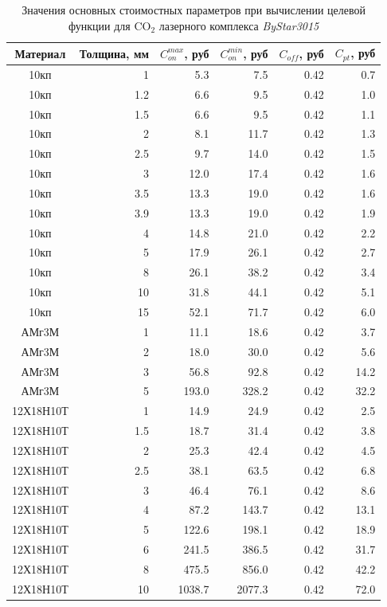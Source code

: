 \documentclass[11pt,twoside,openany]{report}
\begin{document}
\begin{table}
  \caption{
    Значения основных стоимостных параметров
    при вычислении целевой функции для
    CO$_2$ лазерного комплекса
    {\it ByStar3015}
  }
  \label{c-table}
  \centering
  \begin{tabular}{c*{5}{|r}}
    \hline
    Материал & Толщина, мм & $C_{on}^{max}$, руб & $C_{on}^{min}$, руб & $C_{off}$, руб & $C_{pt}$, руб \\
    \hline
    10кп	& 1	& 5.3	& 7.5	& 0.42	& 0.7 \\
    10кп	& 1.2	& 6.6	& 9.5	& 0.42	& 1.0 \\
    10кп	& 1.5	&  6.6	& 9.5	& 0.42	& 1.1 \\
    10кп	& 2	& 8.1	& 11.7	& 0.42	& 1.3 \\
    10кп	& 2.5	&	9.7	& 14.0	& 0.42	& 1.5 \\
    10кп	& 3	& 12.0	& 17.4	& 0.42	& 1.6 \\
    10кп	& 3.5	&	13.3	& 19.0	& 0.42	& 1.6 \\
    10кп	& 3.9	&	13.3	& 19.0	& 0.42	& 1.9 \\
    10кп	& 4	&	14.8	& 21.0	& 0.42	& 2.2 \\
    10кп	& 5	&	17.9	& 26.1	& 0.42	& 2.7 \\
    10кп	& 8	&	26.1	& 38.2	& 0.42	& 3.4 \\
    10кп	& 10	&	31.8	& 44.1	& 0.42	& 5.1 \\
    10кп	& 15	&	52.1	& 71.7	& 0.42	& 6.0 \\
    АМг3М	& 1	& 11.1	& 18.6	& 0.42	& 3.7 \\
    АМг3М	& 2	& 18.0	& 30.0	& 0.42	& 5.6 \\
    АМг3М	& 3	& 56.8	& 92.8	& 0.42	& 14.2 \\
    АМг3М	& 5	& 193.0	& 328.2	& 0.42	& 32.2 \\
    12Х18Н10Т	& 1	& 14.9	& 24.9	& 0.42	& 2.5 \\
    12Х18Н10Т	& 1.5	& 18.7	& 31.4	& 0.42	& 3.8 \\
    12Х18Н10Т	& 2	& 25.3	& 42.4	& 0.42	& 4.5 \\
    12Х18Н10Т	& 2.5	& 38.1	& 63.5	& 0.42	& 6.8 \\
    12Х18Н10Т	& 3	& 46.4	& 76.1	& 0.42	& 8.6 \\
    12Х18Н10Т	& 4	& 87.2	& 143.7	& 0.42	& 13.1 \\
    12Х18Н10Т	& 5	& 122.6	& 198.1	& 0.42	& 18.9 \\
    12Х18Н10Т	& 6	& 241.5	& 386.5	& 0.42	& 31.7 \\
    12Х18Н10Т	& 8	& 475.5	& 856.0	& 0.42	& 42.2 \\
    12Х18Н10Т	& 10	& 1038.7	& 2077.3	& 0.42	& 72.0 \\
    \hline
  \end{tabular}
\end{table}
\end{document}
